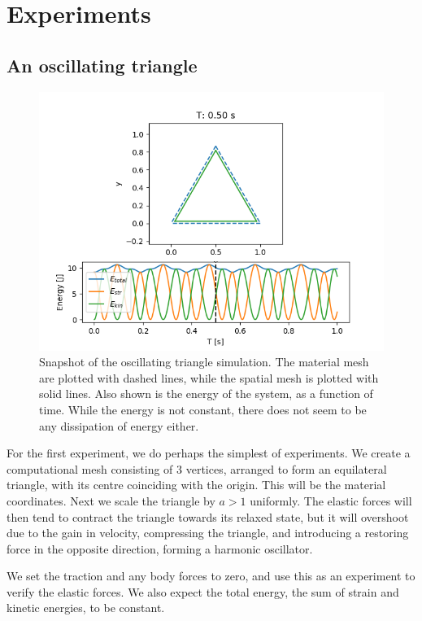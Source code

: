 \documentclass[sigconf]{acmart}
\begin{document}
\section{Experiments}
\subsection{An oscillating triangle}
\begin{figure}
	\centering
	\includegraphics[width=\linewidth]{triangle.png}
	\caption{Snapshot of the oscillating triangle simulation. The material mesh are plotted with dashed lines, while the spatial mesh is plotted with solid lines. Also shown is the energy of the system, as a function of time. While the energy is not constant, there does not seem to be any dissipation of energy either.}
	\label{fig:triangle_sim}
\end{figure}
For the first experiment, we do perhaps the simplest of experiments. We create a computational mesh consisting of 3 vertices, arranged to form an equilateral triangle, with its centre coinciding with the origin. This will be the material coordinates. Next we scale the triangle by $ a>1 $ uniformly. The elastic forces will then tend to contract the triangle towards its relaxed state, but it will overshoot due to the gain in velocity, compressing the triangle, and introducing a restoring force in the opposite direction, forming a harmonic oscillator.

We set the traction and any body forces to zero, and use this as an experiment to verify the elastic forces. We also expect the total energy, the sum of strain and kinetic energies, to be constant.
\end{document}
